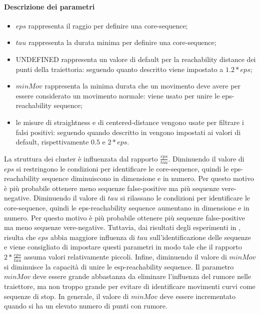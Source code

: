 \documentclass[12pt]{article}
\begin{document}
\paragraph{Descrizione dei parametri} 
\begin{itemize}
    \item $eps$ rappresenta il raggio per definire una core-sequence;
    \item $tau$ rappresenta la durata minima per definire una core-sequence;
    \item UNDEFINED rappresenta un valore di default per la reachability distance dei punti della traiettoria: seguendo quanto descritto \cite{SequenceClustering} viene impostato a $1.2*eps$;
    \item $minMov$ rappresenta la minima durata che un movimento deve avere per essere considerato un movimento normale: viene usato per unire le eps-reachability sequence;
    \item le misure di straightness e di centered-distance vengono usate per filtrare i falsi positivi: seguendo quando descritto in \cite{SequenceClustering} vengono impostati ai valori di default, rispettivamente $0.5$ e $2*eps$.
\end{itemize}
La struttura dei cluster è influenzata dal rapporto $\frac{eps}{tau}$.
Diminuendo il valore di $eps$ si restringono le condizioni per identificare le core-sequence, quindi le eps-reachability sequence diminuiscono in dimensione e in numero.
Per questo motivo è più probabile ottenere meno sequenze false-positive ma più sequenze vere-negative. 
Diminuendo il valore di $tau$ si rilassano le condizioni per identificare le core-sequence, quindi  le eps-reachability sequence aumentano in dimensione e in numero.
Per questo motivo è più probabile ottenere più sequenze false-positive ma meno sequenze vere-negative. 
Tuttavia, dai risultati degli esperimenti in \cite{SequenceClustering}, risulta che $eps$ abbia maggiore influenza di $tau$ sull'identificazione delle sequenze e viene consigliato di impostare questi parametri in modo tale che il rapporto $2*\frac{eps}{tau}$ assuma valori relativamente piccoli.
Infine, diminuendo il valore di $minMov$ si diminuisce la capacità di unire le esp-reachability sequence. 
Il parametro $minMov$ deve essere grande abbastanza da eliminare l'influenza del rumore nelle traiettore, ma non troppo grande per evitare di identificare movimenti curvi come sequenze di stop. In generale, il valore di $minMov$ deve essere incrementato quando si ha un elevato numero di punti con rumore.
\end{document}
